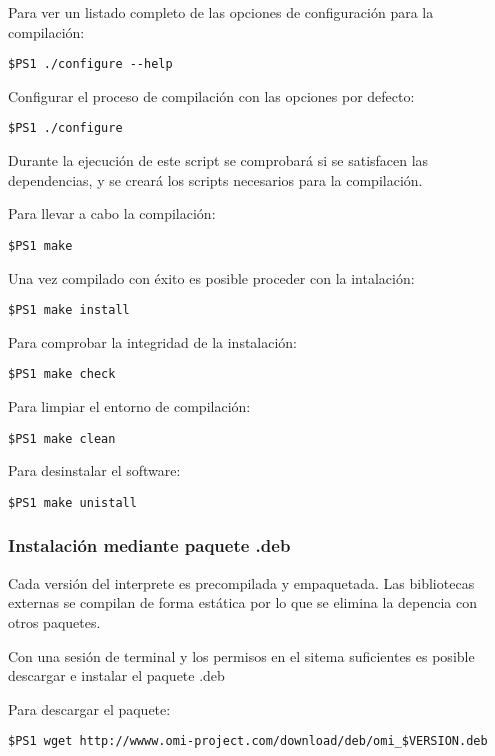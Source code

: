 Para ver un listado completo de las opciones de configuración para la compilación:
\begin{lstlisting}
$PS1 ./configure --help 
\end{lstlisting}

Configurar el proceso de compilación con las opciones por defecto:
\begin{lstlisting}
$PS1 ./configure 
\end{lstlisting}

Durante la ejecución de este script se comprobará si se satisfacen las dependencias, y se creará los scripts necesarios para la compilación.

Para llevar a cabo la compilación:
\begin{lstlisting}
$PS1 make 
\end{lstlisting}

Una vez compilado con éxito es posible proceder con la intalación:
\begin{lstlisting}
$PS1 make install
\end{lstlisting}

Para comprobar la integridad de la instalación:
\begin{lstlisting}
$PS1 make check
\end{lstlisting}
\pagebreak

Para limpiar el entorno de compilación:
\begin{lstlisting}
$PS1 make clean
\end{lstlisting}

Para desinstalar el software:
\begin{lstlisting}
$PS1 make unistall
\end{lstlisting}

\subsubsection{Instalación mediante paquete .deb}\label{sec:deb_pack}
Cada versión del interprete es precompilada y empaquetada. Las bibliotecas externas se compilan
de forma estática por lo que se elimina la depencia con otros paquetes.

Con una sesión de terminal y los permisos en el sitema suficientes es posible descargar e instalar el paquete .deb

Para descargar el paquete:
\begin{lstlisting}
$PS1 wget http://wwww.omi-project.com/download/deb/omi_$VERSION.deb
\end{lstlisting}

